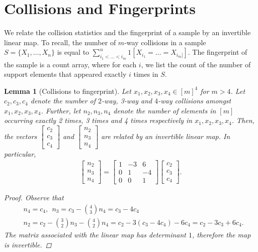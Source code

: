 \documentclass[10pt]{article} %
\theoremstyle{plain}
\newtheorem{lemma}[theorem]{Lemma}
\begin{document}
\section{Collisions and Fingerprints}
\label{app:collisions-fp}

We relate the collision statistics and the fingerprint of a sample by an invertible linear map. To recall, the number of $m$-way collisions in a sample $S=\{X_1,\dots,X_n\}$ is equal to $\sum_{i_1<\dots<i_m}^n1[X_{i_1}=\dots=X_{i_m]}]$. The fingerprint of the sample is a count array, where for each $i$, we list the count of the number of support elements that appeared exactly $i$ times in $S$.
\begin{lemma}[Collisions to fingerprint] 
	\label{lem:collisions-to-fingerprint}
	Let $x_1, x_2, x_3 , x_4  \in [m]^4$ for $m > 4$. Let $c_2, c_3, c_4$ denote the number of $2$-way, 3-way and $4$-way collisions amongst $x_1, x_2, x_3 , x_4$. Further, let $n_2, n_3, n_4$ denote the number of elements in $[m]$ occurring \textit{exactly} 2 times, 3 times and 4 times respectively in $x_1, x_2, x_3 , x_4$. Then, the vectors $\begin{bmatrix}c_2 \\ c_3 \\ c_4\end{bmatrix}$ and $\begin{bmatrix}n_2 \\ n_3 \\ n_4\end{bmatrix}$ are related by an invertible linear map. In particular,
	\begin{align*}
		\begin{bmatrix}n_2 \\ n_3 \\ n_4\end{bmatrix} = \begin{bmatrix} 
			1 & -3 & 6 \\
			0 & 1 & -4 \\
			0 & 0  & 1 
		\end{bmatrix}
		\begin{bmatrix}c_2 \\ c_3 \\ c_4\end{bmatrix}.
	\end{align*}
	\begin{proof}
		Observe that
		\begin{align*}
			&n_4 = c_4, ~~ n_3 = c_3 - \binom{4}{3}n_4 = c_3 - 4c_4\\
			&n_2 = c_2 - \binom{3}{2}n_3 - \binom{4}{2}n_4 = c_2 - 3(c_3 - 4c_4) - 6c_4 = c_2 - 3c_3 + 6c_4.
		\end{align*}
		The matrix associated with the linear map has determinant $1$, therefore the map is invertible.
	\end{proof}
\end{lemma}
\end{document}
